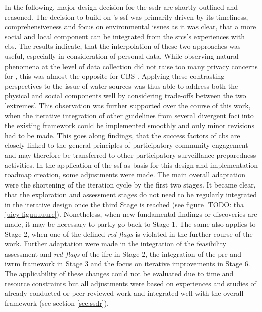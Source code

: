 In the following, major design decision for the \acrshort{ssdr} are shortly outlined and reasoned. The decision to build on \autocite{fraislCitizenScienceEnvironmental2022}'s \acrlong{ssf} was primarily driven by its timeliness, comprehensiveness and focus on environmental issues as it was clear, that a more social and local component can be integrated from the \acrshort{srcs}'s experiences with \acrshort{cbs}. The results indicate, that the interpolation of these two approaches was useful, especially in consideration of personal data. While observing natural phenomena at the level of data collection did not raise too many privacy concerns for \autocite{fraislCitizenScienceEnvironmental2022}, this was almost the opposite for CBS \autocite{ifrcCommunityBasedSurveillanceGuiding2017}. Applying these contrasting perspectives to the issue of water sources was thus able to address both the physical and social components well by considering trade-offs between the two 'extremes'. This observation was further supported over the course of this work, when the iterative integration of other guidelines from several divergent foci into the existing framework could be implemented smoothly and only minor revisions had to be made. This goes along \autocite{mcgowanCommunitybasedSurveillanceInfectious2022} findings, that the success factors of \acrshort{cbs} are closely linked to the general principles of participatory community engagement and may therefore be transferred to other participatory surveillance preparedness activities.\newline
In the application of the \acrshort{ssf} as basis for this design and implementation roadmap creation, some adjustments were made. The main overall adaptation were the shortening of the iteration cycle by the first two stages. It became clear, that the exploration and assessment stages do not need to be regularly integrated in the iterative design once the third Stage is reached (see figure \ref{TODO: tha juicy figuuuuure}). Nonetheless, when new fundamental findings or discoveries are made, it may be necessary to partly go back to Stage 1. The same also applies to Stage 2, when one of the defined \textit{red flags} is violated in the further course of the work. Further adaptation were made in the integration of the feasibility assessment and \textit{red flags} of the \acrshort{ifrc} in Stage 2, the integration of the \acrshort{prc} and \acrshort{iwrm} framework in Stage 3 and the focus on iterative improvements in Stage 6. The applicability of these changes could not be evaluated due to time and resource constraints but all adjustments were based on experiences and studies of already conducted or peer-reviewed work and integrated well with the overall framework (see section \ref{sec:ssdr}).

